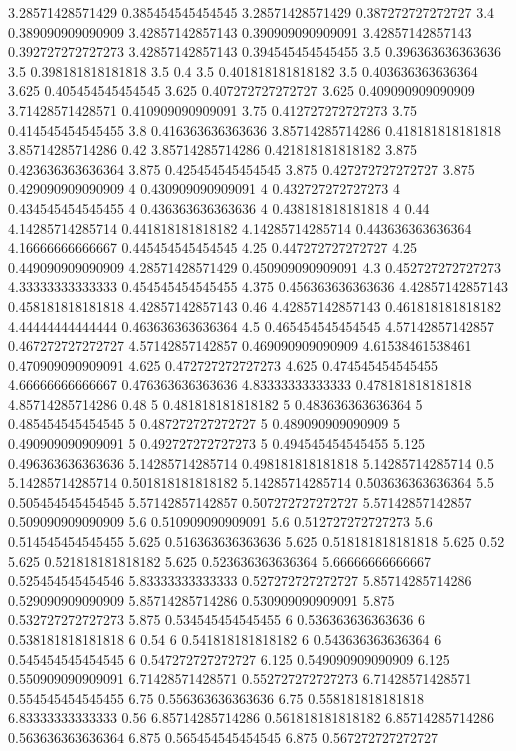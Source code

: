 {3.28571428571429 0.385454545454545
3.28571428571429 0.387272727272727
3.4 0.389090909090909
3.42857142857143 0.390909090909091
3.42857142857143 0.392727272727273
3.42857142857143 0.394545454545455
3.5 0.396363636363636
3.5 0.398181818181818
3.5 0.4
3.5 0.401818181818182
3.5 0.403636363636364
3.625 0.405454545454545
3.625 0.407272727272727
3.625 0.409090909090909
3.71428571428571 0.410909090909091
3.75 0.412727272727273
3.75 0.414545454545455
3.8 0.416363636363636
3.85714285714286 0.418181818181818
3.85714285714286 0.42
3.85714285714286 0.421818181818182
3.875 0.423636363636364
3.875 0.425454545454545
3.875 0.427272727272727
3.875 0.429090909090909
4 0.430909090909091
4 0.432727272727273
4 0.434545454545455
4 0.436363636363636
4 0.438181818181818
4 0.44
4.14285714285714 0.441818181818182
4.14285714285714 0.443636363636364
4.16666666666667 0.445454545454545
4.25 0.447272727272727
4.25 0.449090909090909
4.28571428571429 0.450909090909091
4.3 0.452727272727273
4.33333333333333 0.454545454545455
4.375 0.456363636363636
4.42857142857143 0.458181818181818
4.42857142857143 0.46
4.42857142857143 0.461818181818182
4.44444444444444 0.463636363636364
4.5 0.465454545454545
4.57142857142857 0.467272727272727
4.57142857142857 0.469090909090909
4.61538461538461 0.470909090909091
4.625 0.472727272727273
4.625 0.474545454545455
4.66666666666667 0.476363636363636
4.83333333333333 0.478181818181818
4.85714285714286 0.48
5 0.481818181818182
5 0.483636363636364
5 0.485454545454545
5 0.487272727272727
5 0.489090909090909
5 0.490909090909091
5 0.492727272727273
5 0.494545454545455
5.125 0.496363636363636
5.14285714285714 0.498181818181818
5.14285714285714 0.5
5.14285714285714 0.501818181818182
5.14285714285714 0.503636363636364
5.5 0.505454545454545
5.57142857142857 0.507272727272727
5.57142857142857 0.509090909090909
5.6 0.510909090909091
5.6 0.512727272727273
5.6 0.514545454545455
5.625 0.516363636363636
5.625 0.518181818181818
5.625 0.52
5.625 0.521818181818182
5.625 0.523636363636364
5.66666666666667 0.525454545454546
5.83333333333333 0.527272727272727
5.85714285714286 0.529090909090909
5.85714285714286 0.530909090909091
5.875 0.532727272727273
5.875 0.534545454545455
6 0.536363636363636
6 0.538181818181818
6 0.54
6 0.541818181818182
6 0.543636363636364
6 0.545454545454545
6 0.547272727272727
6.125 0.549090909090909
6.125 0.550909090909091
6.71428571428571 0.552727272727273
6.71428571428571 0.554545454545455
6.75 0.556363636363636
6.75 0.558181818181818
6.83333333333333 0.56
6.85714285714286 0.561818181818182
6.85714285714286 0.563636363636364
6.875 0.565454545454545
6.875 0.567272727272727
}
